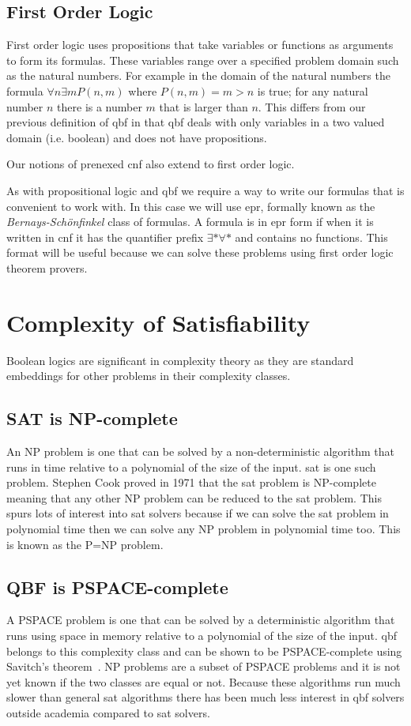 \subsection{First Order Logic}
First order logic uses propositions that take variables or functions as arguments to form its formulas. These variables range over a specified problem domain such as the natural numbers. For example in the domain of the natural numbers the formula $\forall n \exists m P(n, m)$ where $P(n, m) = m > n$ is true; for any natural number $n$ there is a number $m$ that is larger than $n$. This differs from our previous definition of \gls{qbf} in that \gls{qbf} deals with only variables in a two valued domain (i.e. boolean) and does not have propositions.

Our notions of prenexed \gls{cnf} also extend to first order logic.

As with propositional logic and \gls{qbf} we require a way to write our formulas that is convenient to work with. In this case we will use \gls{epr}, formally known as the \textit{Bernays-Sch{\"o}nfinkel} class of formulas. A formula is in \gls{epr} form if when it is written in \gls{cnf} it has the quantifier prefix $\exists * \forall *$ and contains no functions. This format will be useful because we can solve these problems using first order logic theorem provers.

\section{Complexity of Satisfiability}
Boolean logics are significant in complexity theory as they are standard embeddings for other problems in their complexity classes.

\subsection{SAT is NP-complete}
An NP problem is one that can be solved by a non-deterministic algorithm that runs in time relative to a polynomial of the size of the input. \Gls{sat} is one such problem. Stephen Cook proved in 1971 that the \gls{sat} problem is NP-complete~\cite{cook1971complexity} meaning that any other NP problem can be reduced to the \gls{sat} problem. This spurs lots of interest into \gls{sat} solvers because if we can solve the \gls{sat} problem in polynomial time then we can solve any NP problem in polynomial time too. This is known as the P=NP problem.

\subsection{QBF is PSPACE-complete}
A PSPACE problem is one that can be solved by a deterministic algorithm that runs using space in memory relative to a polynomial of the size of the input. \Gls{qbf} belongs to this complexity class and can be shown to be PSPACE-complete using Savitch's theorem~\cite{savitch1970relationships}. NP problems are a subset of PSPACE problems and it is not yet known if the two classes are equal or not. Because these algorithms run much slower than general \gls{sat} algorithms there has been much less interest in \gls{qbf} solvers outside academia compared to \gls{sat} solvers.

